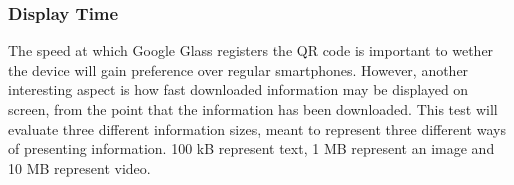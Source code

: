 		

\subsubsection{Display Time}
The speed at which Google Glass registers the QR code is important to wether the device will gain preference over regular smartphones. However, another interesting aspect is how fast downloaded information may be displayed on screen, from the point that the information has been downloaded. %
This test will evaluate three different information sizes, meant to represent three different ways of presenting information. 100 kB represent text, 1 MB represent an image and 10 MB represent video.

       


